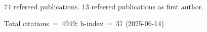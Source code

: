 74 refereed publications. 13 refeered publications as first author.

Total citations~=~4949; h-index~=~37 (2025-06-14)
